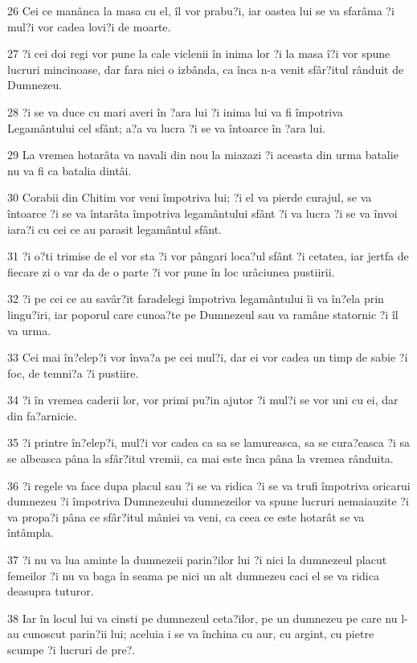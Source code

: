 \par 26 Cei ce manânca la masa cu el, îl vor prabu?i, iar oastea lui se va sfarâma ?i mul?i vor cadea lovi?i de moarte.
\par 27 ?i cei doi regi vor pune la cale viclenii în inima lor ?i la masa î?i vor spune lucruri mincinoase, dar fara nici o izbânda, ca înca n-a venit sfâr?itul rânduit de Dumnezeu.
\par 28 ?i se va duce cu mari averi în ?ara lui ?i inima lui va fi împotriva Legamântului cel sfânt; a?a va lucra ?i se va întoarce în ?ara lui.
\par 29 La vremea hotarâta va navali din nou la miazazi ?i aceasta din urma batalie nu va fi ca batalia dintâi.
\par 30 Corabii din Chitim vor veni împotriva lui; ?i el va pierde curajul, se va întoarce ?i se va întarâta împotriva legamântului sfânt ?i va lucra ?i se va învoi iara?i cu cei ce au parasit legamântul sfânt.
\par 31 ?i o?ti trimise de el vor sta ?i vor pângari loca?ul sfânt ?i cetatea, iar jertfa de fiecare zi o var da de o parte ?i vor pune în loc urâciunea pustiirii.
\par 32 ?i pe cei ce au savâr?it faradelegi împotriva legamântului îi va în?ela prin lingu?iri, iar poporul care cunoa?te pe Dumnezeul sau va ramâne statornic ?i îl va urma.
\par 33 Cei mai în?elep?i vor înva?a pe cei mul?i, dar ei vor cadea un timp de sabie ?i foc, de temni?a ?i pustiire.
\par 34 ?i în vremea caderii lor, vor primi pu?in ajutor ?i mul?i se vor uni cu ei, dar din fa?arnicie.
\par 35 ?i printre în?elep?i, mul?i vor cadea ca sa se lamureasca, sa se cura?easca ?i sa se albeasca pâna la sfâr?itul vremii, ca mai este înca pâna la vremea rânduita.
\par 36 ?i regele va face dupa placul sau ?i se va ridica ?i se va trufi împotriva oricarui dumnezeu ?i împotriva Dumnezeului dumnezeilor va spune lucruri nemaiauzite ?i va propa?i pâna ce sfâr?itul mâniei va veni, ca ceea ce este hotarât se va întâmpla.
\par 37 ?i nu va lua aminte la dumnezeii parin?ilor lui ?i nici la dumnezeul placut femeilor ?i nu va baga în seama pe nici un alt dumnezeu caci el se va ridica deasupra tuturor.
\par 38 Iar în locul lui va cinsti pe dumnezeul ceta?ilor, pe un dumnezeu pe care nu l-au cunoscut parin?ii lui; aceluia i se va închina cu aur, cu argint, cu pietre scumpe ?i lucruri de pre?.
